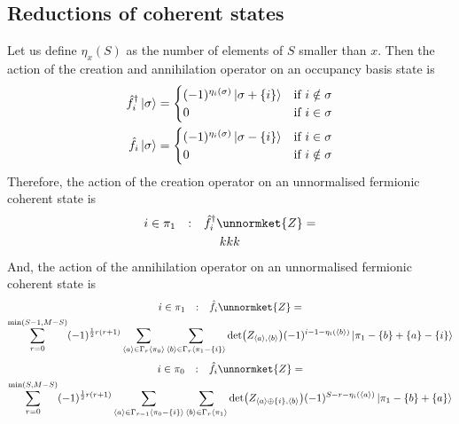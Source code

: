 \documentclass[12pt]{article}
\newcommand{\seq}[1]{\langle #1\rangle}
\newcommand{\hc}{^\dagger}
\begin{document}
	\subsection{Reductions of coherent states}
	Let us define $\eta_x(S)$ as the number of elements of $S$ smaller than $x$. Then the action of the creation and annihilation operator on an occupancy basis state is
	\begin{eqnarray}
	\hat{f}\hc_i\ket{\sigma}=\begin{cases}
		(-1)^{\eta_i(\sigma)}\ket{\sigma + \{i\}} & \text{if }i\notin\sigma\\
		0 & \text{if }i\in\sigma
	\end{cases}\\
	\hat{f}_i\ket{\sigma}=\begin{cases}
		(-1)^{\eta_i(\sigma)}\ket{\sigma - \{i\}} & \text{if }i\in\sigma\\
		0 & \text{if }i\notin\sigma
	\end{cases}
	\end{eqnarray}
	Therefore, the action of the creation operator on an unnormalised fermionic coherent state is
	\begin{multline}
	i\in\pi_1\qq{:}\hat{f}\hc_{i}\unnormket{Z}=\\
	kkk
	\end{multline}
	And, the action of the annihilation operator on an unnormalised fermionic coherent state is
	\begin{multline}
	i\in\pi_1\qq{:}\hat{f}_{i}\unnormket{Z}=\\
	\sum_{r=0}^{\min(S-1,M-S)}(-1)^{\frac{1}{2}r(r+1)}\sum_{\seq{a}\in\Gamma_r\seq{\pi_0}}\sum_{\seq{b}\in\Gamma_r\seq{\pi_1-\{i\}}}\det(Z_{\seq{a},\seq{b}})(-1)^{i-1-\eta_i(\seq{b})}\ket{\pi_1-\{b\}+\{a\}-\{i\}}
	\end{multline}
	\begin{multline}
	i\in\pi_0\qq{:}\hat{f}_{i}\unnormket{Z}=\\
	\sum_{r=0}^{\min(S,M-S)}(-1)^{\frac{1}{2}r(r+1)}\sum_{\seq{a}\in\Gamma_{r-1}\seq{\pi_0-\{i\}}}\sum_{\seq{b}\in\Gamma_r\seq{\pi_1}}\det(Z_{\seq{a}\oplus\{i\},\seq{b}})(-1)^{S-r-\eta_i(\seq{a})}\ket{\pi_1-\{b\}+\{a\}}
	\end{multline}
	
\end{document}
